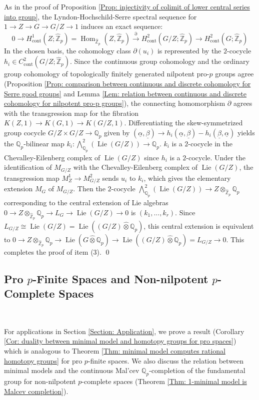 \documentclass[11pt]{amsart}
\theoremstyle{definition}
\numberwithin{equation}{section}
\numberwithin{equation}{section}
\newcommand\QQ{\mathbb{Q}}
\newcommand\ZZ{\mathbb{Z}}
\DeclareMathOperator{\homo}{Hom}
\DeclareMathOperator{\Lie}{Lie}
\DeclareMathOperator{\cont}{cont}
\begin{document}
As in the proof of Proposition \ref{Prop: injectivity of colimit of lower central series into group}, the Lyndon-Hochschild-Serre spectral sequence for $1\rightarrow Z\rightarrow G\rightarrow G/Z\rightarrow 1$ induces an exact sequence:
\[
0\rightarrow H^1_{\cont}(Z;\widehat{\ZZ}_p)=\homo_{\widehat{\ZZ}_p}(Z,\widehat{\ZZ}_p)\xrightarrow{\partial} H^2_{\cont}(G/Z;\widehat{\ZZ}_p) \rightarrow H^2_{\cont}(G;\widehat{\ZZ}_p)
\]
In the chosen basis,
the cohomology class $\partial(u_i)$ is represented by the $2$-cocycle $h_i\in C^2_{\cont}(G/Z;\widehat{\ZZ}_p)$. Since the continuous group cohomology and the ordinary group cohomology of topologically finitely generated nilpotent pro-$p$ groups agree (Proposition \ref{Prop: comparison between continuous and discrete cohomology for Serre good groups} and Lemma \ref{Lem: relation between continuous and discrete cohomology for nilpotent pro-p groups}), the connecting homomorphism $\partial$ agrees with the transgression map for the fibration $K(Z,1)\rightarrow K(G,1)\rightarrow K(G/Z,1)$. Differentiating the skew-symmetrized group cocycle $G/Z\times G/Z\rightarrow \QQ_p$ given by $(\underline{\alpha},\underline{\beta})\rightarrow h_i(\underline{\alpha},\underline{\beta})- h_i(\underline{\beta},\underline{\alpha})$ yields the $\QQ_p$-bilinear map $k_i:\bigwedge^2_{\QQ_p}(\Lie(G/Z))\rightarrow \QQ_p$. $k_i$ is a $2$-cocycle in the Chevalley-Eilenberg complex of $\Lie(G/Z)$ since $h_i$ is a $2$-cocycle. Under the identification of $M_{G/Z}$ with the Chevalley-Eilenberg complex of $\Lie(G/Z)$, the transgression map $M^1_Z\rightarrow M^2_{G/Z}$ sends $u_i$ to $k_i$, which gives the elementary extension $M_G$ of $M_{G/Z}$. Then the $2$-cocycle $\bigwedge^2_{\QQ_p}(\Lie(G/Z))\rightarrow Z\otimes_{\widehat{\ZZ}_p}\QQ_p$ corresponding to the central extension of Lie algebras $0\rightarrow Z\otimes_{\widehat{\ZZ}_p}\QQ_p\rightarrow L_G\rightarrow \Lie(G/Z)\rightarrow 0$ is $(k_1,...,k_r)$. Since $L_{G/Z}\cong\Lie(G/Z)=\Lie((G/Z)\widehat{\otimes}\QQ_p)$, this central extension is equivalent to $0\rightarrow Z\otimes_{\widehat{\ZZ}_p}\QQ_p\rightarrow \Lie(G\widehat{\otimes}\QQ_p)\rightarrow\Lie((G/Z)\widehat{\otimes}\QQ_p)=L_{G/Z}\rightarrow 0$. This completes the proof of item (3).
\qed

\subsection{Pro $p$-Finite Spaces and Non-nilpotent $p$-Complete Spaces}\,

For applications in Section \ref{Section: Application}, we prove a result (Corollary \ref{Cor: duality between minimal model and homotopy groups for pro spaces}) which is analogous to Theorem \ref{Thm: minimal model computes rational homotopy groups} for pro $p$-finite spaces. We also discuss the relation between minimal models and the continuous Mal'cev $\QQ_p$-completion of the fundamental group for non-nilpotent $p$-complete spaces (Theorem \ref{Thm: 1-minimal model is Malcev completion}).
\end{document}
